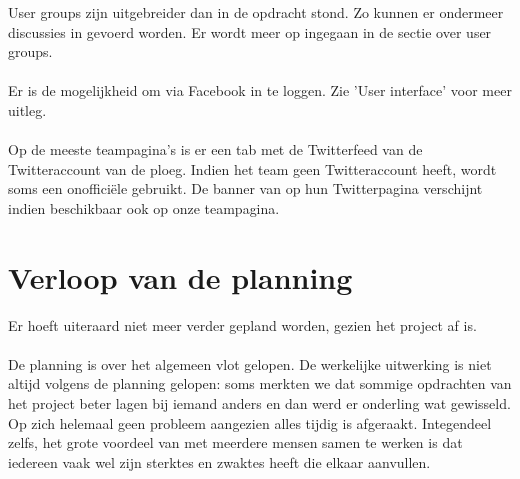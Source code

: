 \documentclass[11pt, a4paper]{article}
\begin{document}
User groups zijn uitgebreider dan in de opdracht stond. Zo kunnen er ondermeer discussies in gevoerd worden. Er wordt meer op ingegaan in de sectie over user groups. \\ \\
Er is de mogelijkheid om via Facebook in te loggen. Zie 'User interface' voor meer uitleg. \\ \\
Op de meeste teampagina's is er een tab met de Twitterfeed van de Twitteraccount van de ploeg. Indien het team geen Twitteraccount heeft, wordt soms een onoffici\"ele gebruikt. De banner van op hun Twitterpagina verschijnt indien beschikbaar ook op onze teampagina.
\section{Verloop van de planning}
Er hoeft uiteraard niet meer verder gepland worden, gezien het project af is.
\\
\\
De planning is over het algemeen vlot gelopen. De werkelijke uitwerking is niet altijd volgens de planning gelopen: soms merkten we dat sommige opdrachten van het project beter lagen bij iemand anders en dan werd er onderling wat gewisseld.
Op zich helemaal geen probleem aangezien alles tijdig is afgeraakt. Integendeel zelfs, het grote voordeel van met meerdere mensen samen te werken is dat iedereen vaak wel zijn sterktes en zwaktes heeft
die elkaar aanvullen.


\end{document}

